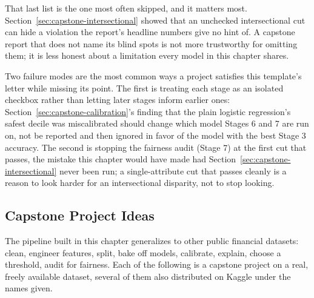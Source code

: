 \documentclass[../ai_in_finance]{subfiles}
\begin{document}
That last list is the one most often skipped, and it matters most. Section~\ref{sec:capstone-intersectional} showed that an unchecked intersectional cut can hide a violation the report's headline numbers give no hint of. A capstone report that does not name its blind spots is not more trustworthy for omitting them; it is less honest about a limitation every model in this chapter shares.

Two failure modes are the most common ways a project satisfies this template's letter while missing its point. The first is treating each stage as an isolated checkbox rather than letting later stages inform earlier ones: Section~\ref{sec:capstone-calibration}'s finding that the plain logistic regression's safest decile was miscalibrated should change which model Stages 6 and 7 are run on, not be reported and then ignored in favor of the model with the best Stage 3 accuracy. The second is stopping the fairness audit (Stage 7) at the first cut that passes, the mistake this chapter would have made had Section~\ref{sec:capstone-intersectional} never been run; a single-attribute cut that passes cleanly is a reason to look harder for an intersectional disparity, not to stop looking.

\subsection{Capstone Project Ideas}
\label{sec:capstone-projects}

The pipeline built in this chapter generalizes to other public financial datasets: clean, engineer features, split, bake off models, calibrate, explain, choose a threshold, audit for fairness. Each of the following is a capstone project on a real, freely available dataset, several of them also distributed on Kaggle under the names given.
\end{document}
